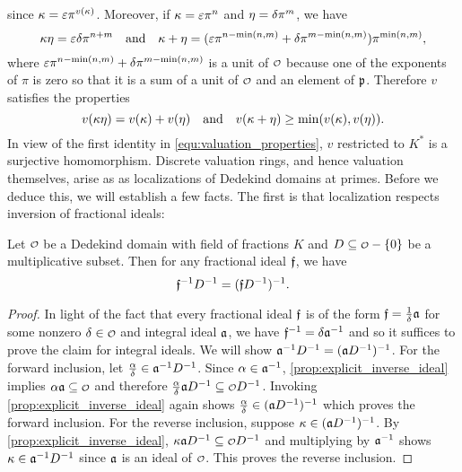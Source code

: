     since $\kappa = \varepsilon\pi^{v(\kappa)}$. Moreover, if $\kappa = \varepsilon\pi^{n}$ and $\eta = \delta\pi^{m}$, we have
    \[
      \kappa\eta = \varepsilon\delta\pi^{n+m} \quad \text{and} \quad \kappa+\eta = (\varepsilon\pi^{n-\min(n,m)}+\delta\pi^{m-\min(n,m)})\pi^{\min(n,m)},
    \]
    where $\varepsilon\pi^{n-\min(n,m)}+\delta\pi^{m-\min(n,m)}$ is a unit of $\smc{O}$ because one of the exponents of $\pi$ is zero so that it is a sum of a unit of $\smc{O}$ and an element of $\mathfrak{p}$. Therefore $v$ satisfies the properties
    \begin{equation}\label{equ:valuation_properties}
      v(\kappa\eta) = v(\kappa)+v(\eta) \quad \text{and} \quad v(\kappa+\eta) \ge \min(v(\kappa),v(\eta)).
    \end{equation}
    In view of the first identity in \cref{equ:valuation_properties}, $v$ restricted to $K^{\ast}$ is a surjective homomorphism. Discrete valuation rings, and hence valuation themselves, arise as as localizations of Dedekind domains at primes. Before we deduce this, we will establish a few facts. The first is that localization respects inversion of fractional ideals:
    
    \begin{proposition}\label{prop:localization_of_inverse_is_inverse_of_localization}
      Let $\smc{O}$ be a Dedekind domain with field of fractions $K$ and $D \subseteq \smc{O}-\{0\}$ be a multiplicative subset. Then for any fractional ideal $\mathfrak{f}$, we have
      \[
        \mathfrak{f}^{-1}D^{-1} = (\mathfrak{f}D^{-1})^{-1}.
      \]
    \end{proposition}
    \begin{proof}
      In light of the fact that every fractional ideal $\mathfrak{f}$ is of the form $\mathfrak{f} = \frac{1}{\delta}\mathfrak{a}$ for some nonzero $\d \in \smc{O}$ and integral ideal $\mathfrak{a}$, we have $\mathfrak{f}^{-1} = \delta\mathfrak{a}^{-1}$ and so it suffices to prove the claim for integral ideals. We will show $\mathfrak{a}^{-1}D^{-1} = (\mathfrak{a}D^{-1})^{-1}$. For the forward inclusion, let $\frac{\alpha}{\delta} \in \mathfrak{a}^{-1}D^{-1}$. Since $\alpha \in \mathfrak{a}^{-1}$, \cref{prop:explicit_inverse_ideal} implies $\a\mf{a} \subseteq \smc{O}$ and therefore $\frac{\a}{\d}\mf{a}D^{-1} \subseteq \smc{O}D^{-1}$. Invoking \cref{prop:explicit_inverse_ideal} again shows $\frac{\alpha}{\delta} \in (\mathfrak{a}D^{-1})^{-1}$ which proves the forward inclusion. For the reverse inclusion, suppose $\kappa \in (\mathfrak{a}D^{-1})^{-1}$. By \cref{prop:explicit_inverse_ideal}, $\k\mf{a}D^{-1} \subseteq \smc{O}D^{-1}$ and multiplying by $\mathfrak{a}^{-1}$ shows $\kappa \in \mathfrak{a}^{-1}D^{-1}$ since $\mathfrak{a}$ is an ideal of $\smc{O}$. This proves the reverse inclusion.
    \end{proof}

